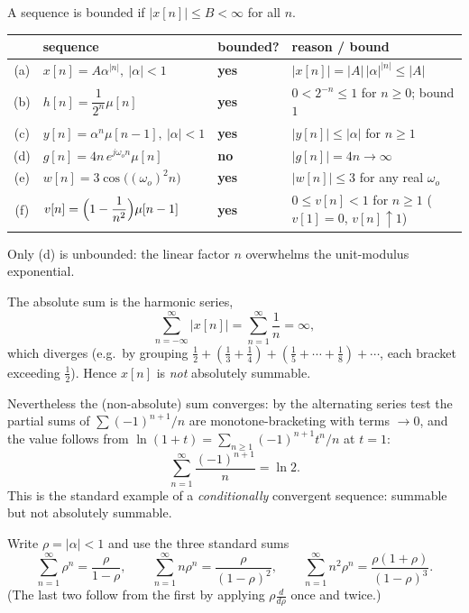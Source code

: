 
A sequence is bounded if $|x[n]|\le B<\infty$ for all $n$.

\begin{center}
\renewcommand{\arraystretch}{1.45}
\begin{tabular}{@{}clll@{}}
\toprule
& sequence & bounded? & reason / bound\\
\midrule
(a) & $x[n]=A\alpha^{|n|},\ |\alpha|<1$ & \textbf{yes} & $|x[n]|=|A|\,|\alpha|^{|n|}\le |A|$\\
(b) & $h[n]=\dfrac{1}{2^{n}}\mu[n]$ & \textbf{yes} & $0<2^{-n}\le 1$ for $n\ge 0$; bound $1$\\
(c) & $y[n]=\alpha^{n}\mu[n-1],\ |\alpha|<1$ & \textbf{yes} & $|y[n]|\le|\alpha|$ for $n\ge1$\\
(d) & $g[n]=4n\,e^{j\omega_o n}\mu[n]$ & \textbf{no} & $|g[n]|=4n\to\infty$\\
(e) & $w[n]=3\cos\bigl((\omega_o)^{2}n\bigr)$ & \textbf{yes} & $|w[n]|\le 3$ for any real $\omega_o$\\
(f) & $v[n]=\Bigl(1-\dfrac{1}{n^{2}}\Bigr)\mu[n-1]$ & \textbf{yes} & $0\le v[n]<1$ for $n\ge1$ ($v[1]=0$, $v[n]\uparrow1$)\\
\bottomrule
\end{tabular}
\end{center}
Only (d) is unbounded: the linear factor $n$ overwhelms the unit-modulus exponential.


The absolute sum is the harmonic series,
\[
\sum_{n=-\infty}^{\infty}|x[n]|=\sum_{n=1}^{\infty}\frac{1}{n}=\infty ,
\]
which diverges (e.g.\ by grouping $\tfrac12+(\tfrac13+\tfrac14)+(\tfrac15+\cdots+\tfrac18)+\cdots$,
each bracket exceeding $\tfrac12$). Hence $x[n]$ is \emph{not} absolutely summable.

Nevertheless the (non-absolute) sum converges: by the alternating series test the partial sums
of $\sum(-1)^{n+1}/n$ are monotone-bracketing with terms $\to0$, and the value follows from
$\ln(1+t)=\sum_{n\ge1}(-1)^{n+1}t^{n}/n$ at $t=1$:
\[
\sum_{n=1}^{\infty}\frac{(-1)^{n+1}}{n}=\ln 2 .
\]
This is the standard example of a \emph{conditionally} convergent sequence: summable but not
absolutely summable.


Write $\rho=|\alpha|<1$ and use the three standard sums
\[
\sum_{n=1}^{\infty}\rho^{n}=\frac{\rho}{1-\rho},\qquad
\sum_{n=1}^{\infty}n\rho^{n}=\frac{\rho}{(1-\rho)^{2}},\qquad
\sum_{n=1}^{\infty}n^{2}\rho^{n}=\frac{\rho(1+\rho)}{(1-\rho)^{3}} .
\]
(The last two follow from the first by applying $\rho\frac{d}{d\rho}$ once and twice.)

